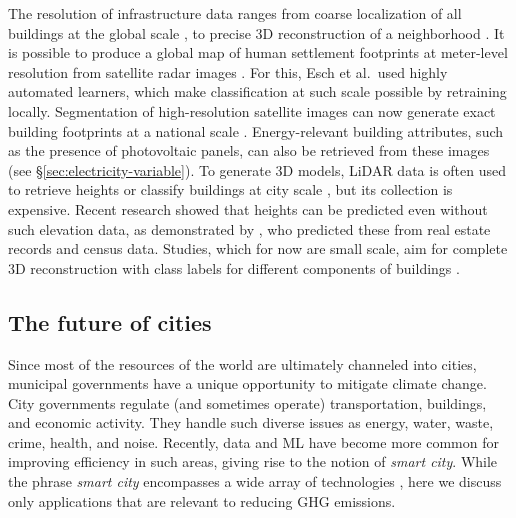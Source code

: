 \documentclass[11pt]{report}
\newcommand{\et}{et al.~}
\begin{document}
The resolution of infrastructure data ranges from coarse localization of all buildings at the global scale \cite{esch2017breaking}, to precise 3D reconstruction of a neighborhood \cite{blaha2016large}. It is possible to produce a global map of human settlement footprints at meter-level resolution from satellite radar images \cite{esch2017breaking}. For this, Esch \et used highly automated learners, which make classification at such scale possible by retraining locally. Segmentation of high-resolution satellite images can now generate exact building footprints at a national scale \cite{microsoftbuildings}. Energy-relevant building attributes, such as the presence of photovoltaic panels, can also be retrieved from these images \cite{yu2018deepsolar} (see \S\ref{sec:electricity-variable}). 
To generate 3D models, LiDAR data is often used to retrieve heights or classify buildings at city scale \cite{LU2014134,Henn2012}, but its collection is expensive. 
Recent research showed that heights can be predicted even without such elevation data, as demonstrated by \cite{BILJECKI20171}, who predicted these from real estate records and census data. 
Studies, which for now are small scale, aim for complete 3D reconstruction with class labels for different components of buildings \cite{blaha2016large}. 

\subsection{The future of cities}\label{sec:cities}
Since most of the resources of the world are ultimately channeled into cities, municipal governments have a unique opportunity to mitigate climate change. City governments regulate (and sometimes operate) transportation, buildings, and economic activity. They handle such diverse issues as energy, water, waste, crime, health, and noise. Recently, data and ML have become more common for improving efficiency in such areas, giving rise to the notion of \emph{smart city}. While the phrase \emph{smart city} encompasses a wide array of technologies \cite{neirotti2014current}, here we discuss only applications that are relevant to reducing GHG emissions.
\end{document}

